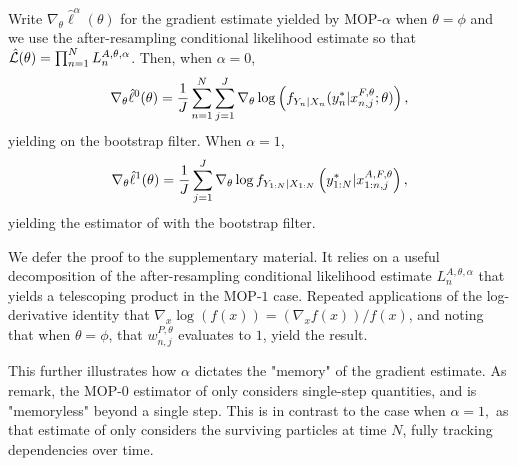 \documentclass[9pt,twocolumn,twoside]{pnas-new}
\begin{document}
\begin{thm}
    \label{thm:mop-functional-forms}
    Write $\nabla_\theta \hat\ell^\alpha(\theta)$ for the gradient estimate yielded by MOP-$\alpha$ when $\theta=\phi$ and we use the after-resampling conditional likelihood estimate so that $\hat{\mathcal{L}}(\theta) = \prod_{n=1}^N L_n^{A, \theta, \alpha}$. Then, when $\alpha=0$,
    \vspace*{-2.5mm}
    \begin{equation}
        \nabla_\theta \hat\ell^0(\theta) 
        = \frac{1}{J} \sum_{n=1}^N \sum_{j=1}^J \nabla_\theta \log\left(f_{Y_n|X_{n}}(y_n^*|x_{n,j}^{F, \theta}; \theta)\right),
        \vspace*{-2.5mm}
    \end{equation}
    yielding \cite{blei2018vsmc} on the bootstrap filter. When $\alpha=1$,
    \vspace*{-2.5mm}
    \begin{equation}
        \nabla_\theta \hat{\ell}^1(\theta) 
        = \frac{1}{J}\sum_{j=1}^J \nabla_\theta \log f_{Y_{1:N}|X_{1:N}}\left(y_{1:N}^* | x_{1:n,j}^{A, F,\theta}\right),
    \vspace*{-2.5mm}
    \end{equation}
    yielding the estimator of \cite{poyiadjis11, scibior21} with the bootstrap filter.
\end{thm}

We defer the proof to the supplementary material. It relies on a useful decomposition of the after-resampling conditional likelihood estimate $L_n^{A,\theta,\alpha}$ that yields a telescoping product in the MOP-$1$ case. Repeated applications of the log-derivative identity that $\nabla_x \log(f(x)) = (\nabla_x f(x))/f(x)$, and noting that when $\theta=\phi$, that $w_{n,j}^{P,\theta}$ evaluates to $1$, yield the result. 

This further illustrates how $\alpha$ dictates the "memory" of the gradient estimate. As \cite{scibior2021dpf} remark, the MOP-$0$ estimator of \cite{blei2018vsmc} only considers single-step quantities, and is "memoryless" beyond a single step. This is in contrast to the case when $\alpha=1,$ as that estimate of \cite{poyiadjis11} only considers the surviving particles at time $N$, fully tracking dependencies over time. 
\end{document}
